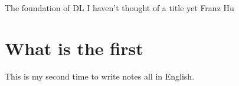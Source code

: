 \documentclass{../../bjhh} %
\begin{document}
\pagestyle{empty} %

\makemytitle
    {The foundation of DL}
    {I haven't thought of a title yet}
    {Franz Hu} 

\section*{What is the first}
This is my second time to write notes all in English.


\newpage
\tableofcontents
\newpage

\pagestyle{fancy} %
\setcounter{page}{1}

\end{document}
